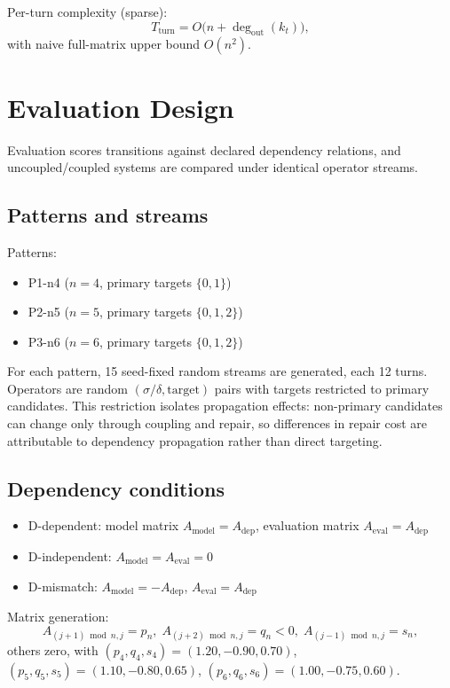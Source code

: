 \documentclass[11pt,a4paper]{article}
\begin{document}
Per-turn complexity (sparse):
\[
T_{\text{turn}}=O\big(n+\deg_{\text{out}}(k_t)\big),
\]
with naive full-matrix upper bound \(O(n^2)\).

\section{Evaluation Design}
\label{sec:evaluation_design}
Evaluation scores transitions against declared dependency relations, and uncoupled/coupled systems are compared under identical operator streams.

\subsection{Patterns and streams}
Patterns:
\begin{itemize}
  \item P1-n4 (\(n=4\), primary targets \(\{0,1\}\))
  \item P2-n5 (\(n=5\), primary targets \(\{0,1,2\}\))
  \item P3-n6 (\(n=6\), primary targets \(\{0,1,2\}\))
\end{itemize}
For each pattern, 15 seed-fixed random streams are generated, each 12 turns.
Operators are random \((\sigma/\delta,\text{target})\) pairs with targets restricted to primary candidates.
This restriction isolates propagation effects: non-primary candidates can change only through coupling and repair, so differences in repair cost are attributable to dependency propagation rather than direct targeting.

\subsection{Dependency conditions}
\begin{itemize}
  \item D-dependent: model matrix \(A_{\text{model}}=A_{\text{dep}}\), evaluation matrix \(A_{\text{eval}}=A_{\text{dep}}\)
  \item D-independent: \(A_{\text{model}}=A_{\text{eval}}=0\)
  \item D-mismatch: \(A_{\text{model}}=-A_{\text{dep}}\), \(A_{\text{eval}}=A_{\text{dep}}\)
\end{itemize}

Matrix generation:
\[
A_{(j+1)\bmod n,j}=p_n,\;
A_{(j+2)\bmod n,j}=q_n<0,\;
A_{(j-1)\bmod n,j}=s_n,
\]
others zero, with
\((p_4,q_4,s_4)=(1.20,-0.90,0.70)\),
\((p_5,q_5,s_5)=(1.10,-0.80,0.65)\),
\((p_6,q_6,s_6)=(1.00,-0.75,0.60)\).
\end{document}
